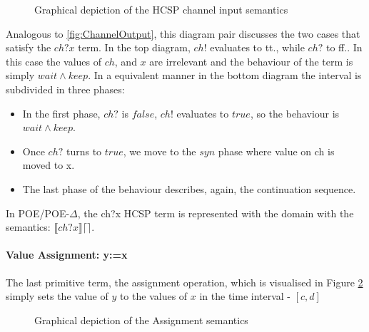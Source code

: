 \documentclass[runningheads,a4paper]{llncs}
\begin{document}
\begin{figure}[hbt]
  \caption{Graphical depiction of the HCSP channel input semantics}
  \label{fig:ChannelInput}
\end{figure}

Analogous to \ref{fig:ChannelOutput}, this diagram pair discusses the
two cases that satisfy the $ch?x$ term. In the top diagram, $ch!$ evaluates to
tt., while $ch?$ to ff.. In this case the values
of $ch$, and $x$ are irrelevant and the behaviour of the term is
simply $wait \wedge keep$.  In a equivalent manner in the bottom
diagram the interval is subdivided in three phases:
\begin{itemize}
\item In the first phase, $ch?$ is $false$, $ch!$ evaluates to $true$,
  so the behaviour is $wait \wedge keep$.
\item Once $ch?$ turns to $true$, we move to the $syn$ phase where
  value on ch is moved to x.
\item The last phase of the behaviour describes, again, the
  continuation sequence.
\end{itemize}

In POE/POE-$\Delta$, the ch?x HCSP term is represented with the
 domain with the semantics: $\llbracket
ch?x \rrbracket \lceil \rceil$.

\paragraph{Value Assignment: y:=x}
The last primitive term, the assignment operation, which is visualised
in Figure \ref{fig:Assignment} simply sets the value of $y$ to the
values of $x$ in the time interval - $[c, d]$
\begin{figure}[hbt]
  \caption{Graphical depiction of the Assignment semantics}
  \label{fig:Assignment}
\end{figure}
\end{document}
